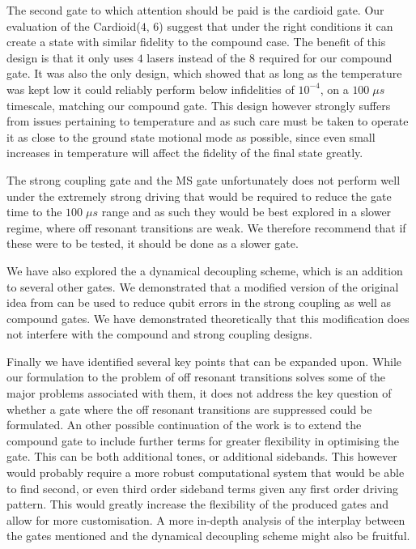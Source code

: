 \documentclass[12pt,twoside]{report}
\begin{document}
The second gate to which attention should be paid is the cardioid gate. Our evaluation of the Cardioid($4$, $6$) suggest that under the right conditions it can create a state with similar fidelity to the compound case. The benefit of this design is that it only uses $4$ lasers instead of the $8$ required for our compound gate. It was also the only design, which showed that as long as the temperature was kept low it could reliably perform below infidelities of $10^{-4}$, on a $100\;\mu s$ timescale, matching our compound gate. This design however strongly suffers from issues pertaining to temperature and as such care must be taken to operate it as close to the ground state motional mode as possible, since even small increases in temperature will affect the fidelity of the final state greatly.

The strong coupling gate and the MS gate unfortunately does not perform well under the extremely strong driving that would be required to reduce the gate time to the $100\;\mu s$ range and as such they would be best explored in a slower regime, where off resonant transitions are weak. We therefore recommend that if these were to be tested, it should be done as a slower gate.

We have also explored the a dynamical decoupling scheme, which is an addition to several other gates. We demonstrated that a modified version of the original idea from \cite{DD_Paper} can be used to reduce qubit errors in the strong coupling as well as compound gates. We have demonstrated theoretically that this modification does not interfere with the compound and strong coupling designs.

Finally we have identified several key points that can be expanded upon. While our formulation to the problem of off resonant transitions solves some of the major problems associated with them, it does not address the key question of whether a gate where the off resonant transitions are suppressed could be formulated. An other possible continuation of the work is to extend the compound gate to include further terms for greater flexibility in optimising the gate. This can be both additional tones, or additional sidebands. This however would probably require a more robust computational system that would be able to find second, or even third order sideband terms given any first order driving pattern. This would greatly increase the flexibility of the produced gates and allow for more customisation. A more in-depth analysis of the interplay between the gates mentioned and the dynamical decoupling scheme might also be fruitful.





\end{document}
